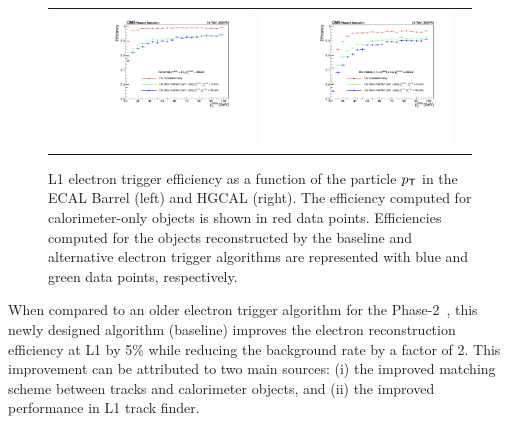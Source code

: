  \begin{figure}[tbh!]
 \begin{center}
 \begin{tabular}{ccc}
  \includegraphics[width=.45\linewidth]{figures/Part2/Upgrade/eff_barrel}&
  \includegraphics[width=.45\linewidth]{figures/Part2/Upgrade/eff_endcap}&
 \end{tabular}
 \caption{\ac{L1} electron trigger efficiency as a function of the particle $p_{\textsf{T}}$ in the \ac{ECAL} Barrel (left) and \ac{HGCAL} (right). The efficiency computed for calorimeter-only objects is shown in red data points. Efficiencies computed for the objects reconstructed by the baseline and alternative electron trigger algorithms are represented with blue and green data points, respectively.}
 \label{fig:eff_electron}
 \end{center}
\end{figure}

When compared to an older electron trigger algorithm for the Phase-2~\cite{Contardo:2015bmq}, this newly designed algorithm (baseline) improves the electron reconstruction efficiency at \ac{L1} by 5\% while reducing the background rate by a factor of 2. This improvement can be attributed to two main sources: (i) the improved matching scheme between tracks and calorimeter objects, and (ii) the improved performance in \ac{L1} track finder.